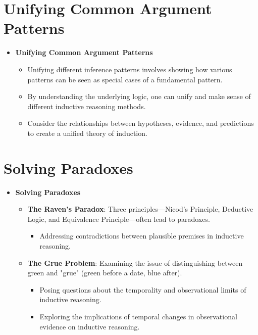\documentclass{article}
\begin{document}
\section{Unifying Common Argument Patterns}
\begin{itemize}
  \item \textbf{Unifying Common Argument Patterns}
    \begin{itemize}
      \item Unifying different inference patterns involves showing how various patterns can be seen as special cases of a fundamental pattern.
      \item By understanding the underlying logic, one can unify and make sense of different inductive reasoning methods.
      \item Consider the relationships between hypotheses, evidence, and predictions to create a unified theory of induction.
    \end{itemize}
\end{itemize}

\section{Solving Paradoxes}
\begin{itemize}
  \item \textbf{Solving Paradoxes}
    \begin{itemize}
      \item \textbf{The Raven's Paradox}: Three principles—Nicod's Principle, Deductive Logic, and Equivalence Principle—often lead to paradoxes.
          \begin{itemize}
            \item Addressing contradictions between plausible premises in inductive reasoning.
          \end{itemize}
      \item \textbf{The Grue Problem}: Examining the issue of distinguishing between green and "grue" (green before a date, blue after).
          \begin{itemize}
            \item Posing questions about the temporality and observational limits of inductive reasoning.
            \item Exploring the implications of temporal changes in observational evidence on inductive reasoning.
          \end{itemize}
    \end{itemize}
\end{itemize}
\end{document}
